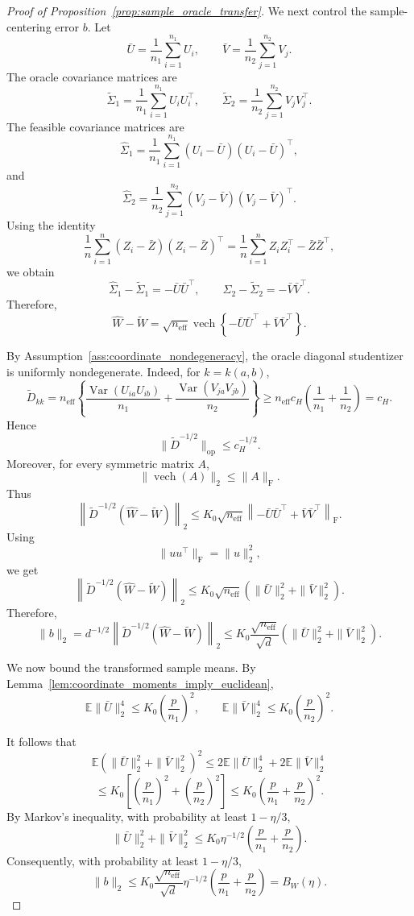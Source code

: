 \documentclass[
  12pt]{article}
\theoremstyle{plain}
\theoremstyle{definition}
\theoremstyle{remark}
\begin{document}
\begin{proof}[Proof of Proposition~\ref{prop:sample_oracle_transfer}]
We next control the sample-centering error \(b\). Let
\[
\bar U=\frac1{n_1}\sum_{i=1}^{n_1}U_i,
\qquad
\bar V=\frac1{n_2}\sum_{j=1}^{n_2}V_j.
\]
The oracle covariance matrices are
\[
\widetilde\Sigma_1
=
\frac1{n_1}\sum_{i=1}^{n_1}U_iU_i^\top,
\qquad
\widetilde\Sigma_2
=
\frac1{n_2}\sum_{j=1}^{n_2}V_jV_j^\top.
\]
The feasible covariance matrices are
\[
\widehat\Sigma_1
=
\frac1{n_1}\sum_{i=1}^{n_1}(U_i-\bar U)(U_i-\bar U)^\top,
\]
and
\[
\widehat\Sigma_2
=
\frac1{n_2}\sum_{j=1}^{n_2}(V_j-\bar V)(V_j-\bar V)^\top.
\]
Using the identity
\[
\frac1n\sum_{i=1}^n(Z_i-\bar Z)(Z_i-\bar Z)^\top
=
\frac1n\sum_{i=1}^n Z_iZ_i^\top-\bar Z\bar Z^\top,
\]
we obtain
\[
\widehat\Sigma_1-\widetilde\Sigma_1
=
-\bar U\bar U^\top,
\qquad
\widehat\Sigma_2-\widetilde\Sigma_2
=
-\bar V\bar V^\top.
\]
Therefore,
\[
\widehat W-\widetilde W
=
\sqrt{n_{\mathrm{eff}}}
\operatorname{vech}
\left\{
-\bar U\bar U^\top+\bar V\bar V^\top
\right\}.
\]

By Assumption~\ref{ass:coordinate_nondegeneracy}, the oracle diagonal
studentizer is uniformly nondegenerate. Indeed, for \(k=k(a,b)\),
\[
\widetilde D_{kk}
=
n_{\mathrm{eff}}
\left\{
\frac{\operatorname{Var}(U_{ia}U_{ib})}{n_1}
+
\frac{\operatorname{Var}(V_{ja}V_{jb})}{n_2}
\right\}
\ge
n_{\mathrm{eff}}c_H
\left(
\frac1{n_1}+\frac1{n_2}
\right)
=
c_H.
\]
Hence
\[
\|\widetilde D^{-1/2}\|_{\mathrm{op}}\le c_H^{-1/2}.
\]
Moreover, for every symmetric matrix \(A\),
\[
\|\operatorname{vech}(A)\|_2\le \|A\|_{\mathrm F}.
\]
Thus
\[
\left\|
\widetilde D^{-1/2}(\widehat W-\widetilde W)
\right\|_2
\le
K_0\sqrt{n_{\mathrm{eff}}}
\left\|
-\bar U\bar U^\top+\bar V\bar V^\top
\right\|_{\mathrm F}.
\]
Using
\[
\|uu^\top\|_{\mathrm F}=\|u\|_2^2,
\]
we get
\[
\left\|
\widetilde D^{-1/2}(\widehat W-\widetilde W)
\right\|_2
\le
K_0\sqrt{n_{\mathrm{eff}}}
\left(
\|\bar U\|_2^2+\|\bar V\|_2^2
\right).
\]
Therefore,
\[
\|b\|_2
=
d^{-1/2}
\left\|
\widetilde D^{-1/2}(\widehat W-\widetilde W)
\right\|_2
\le
K_0
\frac{\sqrt{n_{\mathrm{eff}}}}{\sqrt d}
\left(
\|\bar U\|_2^2+\|\bar V\|_2^2
\right).
\]

We now bound the transformed sample means. By
Lemma~\ref{lem:coordinate_moments_imply_euclidean},
\[
\mathbb E\|\bar U\|_2^4
\le
K_0\left(\frac p{n_1}\right)^2,
\qquad
\mathbb E\|\bar V\|_2^4
\le
K_0\left(\frac p{n_2}\right)^2.
\]

It follows that
\[
\mathbb E
\left(
\|\bar U\|_2^2+\|\bar V\|_2^2
\right)^2
\le
2\mathbb E\|\bar U\|_2^4
+
2\mathbb E\|\bar V\|_2^4
\]
\[
\le
K_0
\left[
\left(\frac p{n_1}\right)^2
+
\left(\frac p{n_2}\right)^2
\right]
\le
K_0
\left(
\frac p{n_1}
+
\frac p{n_2}
\right)^2.
\]
By Markov's inequality, with probability at least \(1-\eta/3\),
\[
\|\bar U\|_2^2+\|\bar V\|_2^2
\le
K_0\eta^{-1/2}
\left(
\frac p{n_1}
+
\frac p{n_2}
\right).
\]
Consequently, with probability at least \(1-\eta/3\),
\[
\|b\|_2
\le
K_0
\frac{\sqrt{n_{\mathrm{eff}}}}{\sqrt d}
\eta^{-1/2}
\left(
\frac p{n_1}
+
\frac p{n_2}
\right)
=
B_W(\eta).
\]


\end{proof}
\end{document}
